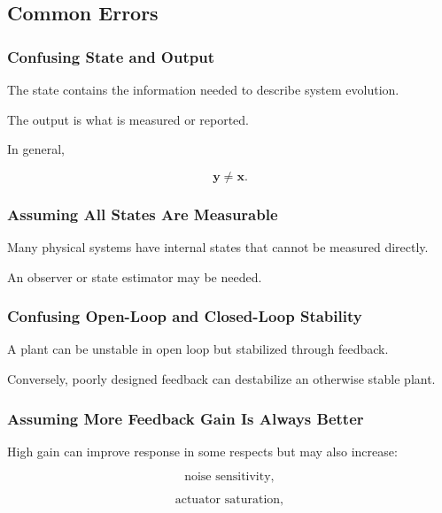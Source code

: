 \subsection{Common Errors}
\label{subsec:control-theory-common-errors}

\subsubsection{Confusing State and Output}

The state contains the information needed to describe system evolution.

The output is what is measured or reported.

In general,

\[
\boxed{
\mathbf{y}
\neq
\mathbf{x}.
}
\]

\subsubsection{Assuming All States Are Measurable}

Many physical systems have internal states that cannot be measured directly.

An observer or state estimator may be needed.

\subsubsection{Confusing Open-Loop and Closed-Loop Stability}

A plant can be unstable in open loop but stabilized through feedback.

Conversely, poorly designed feedback can destabilize an otherwise stable
plant.

\subsubsection{Assuming More Feedback Gain Is Always Better}

High gain can improve response in some respects but may also increase:

\[
\boxed{
\text{noise sensitivity},
}
\]

\[
\boxed{
\text{actuator saturation},
}
\]

